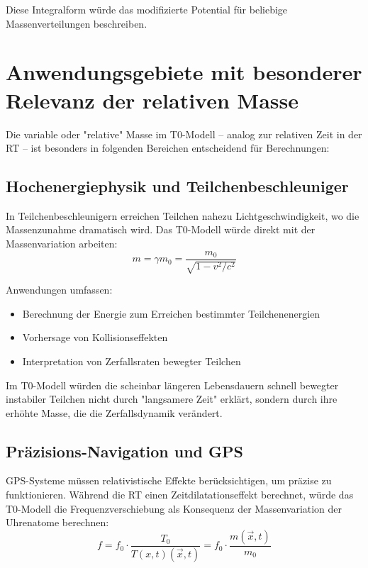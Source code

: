 \documentclass[12pt,a4paper]{article}
\newcommand{\Tfieldt}{T(x,t)}
\newcommand{\vecx}{\vec{x}}
\begin{document}
	Diese Integralform würde das modifizierte Potential für beliebige Massenverteilungen beschreiben.
	
	\section{Anwendungsgebiete mit besonderer Relevanz der relativen Masse}
	\label{sec:relative_mass_applications}
	
	Die variable oder "relative" Masse im T0-Modell – analog zur relativen Zeit in der RT – ist besonders in folgenden Bereichen entscheidend für Berechnungen:
	
	\subsection{Hochenergiephysik und Teilchenbeschleuniger}
	\label{subsec:high_energy_physics}
	
	In Teilchenbeschleunigern erreichen Teilchen nahezu Lichtgeschwindigkeit, wo die Massenzunahme dramatisch wird. Das T0-Modell würde direkt mit der Massenvariation arbeiten:
	\begin{equation}
		m = \gamma m_0 = \frac{m_0}{\sqrt{1-v^2/c^2}}
	\end{equation}
	
	Anwendungen umfassen:
	\begin{itemize}
		\item Berechnung der Energie zum Erreichen bestimmter Teilchenenergien
		\item Vorhersage von Kollisionseffekten
		\item Interpretation von Zerfallsraten bewegter Teilchen
	\end{itemize}
	
	Im T0-Modell würden die scheinbar längeren Lebensdauern schnell bewegter instabiler Teilchen nicht durch "langsamere Zeit" erklärt, sondern durch ihre erhöhte Masse, die die Zerfallsdynamik verändert.
	
	\subsection{Präzisions-Navigation und GPS}
	\label{subsec:gps}
	
	GPS-Systeme müssen relativistische Effekte berücksichtigen, um präzise zu funktionieren. Während die RT einen Zeitdilatationseffekt berechnet, würde das T0-Modell die Frequenzverschiebung als Konsequenz der Massenvariation der Uhrenatome berechnen:
	\begin{equation}
		f = f_0 \cdot \frac{T_0}{\Tfieldt(\vecx,t)} = f_0 \cdot \frac{m(\vecx,t)}{m_0}
	\end{equation}
	
\end{document}
